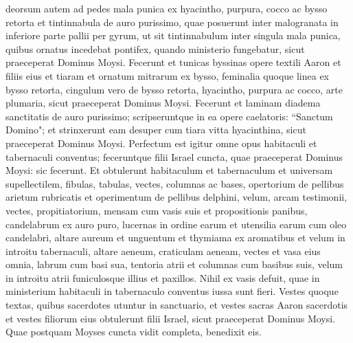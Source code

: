 \begin{biblechapter}
\verse deorsum autem ad pedes mala punica ex hyacintho, purpura, cocco ac bysso retorta  
\verse et tintinnabula de auro purissimo, quae posuerunt inter malogranata in inferiore parte pallii per gyrum, 
\verse ut sit tintinnabulum inter singula mala punica, quibus ornatus incedebat pontifex, quando ministerio fungebatur, sicut praeceperat Dominus Moysi. 
\verse Fecerunt et tunicas byssinas opere textili Aaron et filiis eius 
\verse et tiaram et ornatum mitrarum ex bysso, feminalia quoque linea ex bysso retorta,  
\verse cingulum vero de bysso retorta, hyacintho, purpura ac cocco, arte plumaria, sicut praeceperat Dominus Moysi. 
\verse Fecerunt et laminam diadema sanctitatis de auro purissimo; scripseruntque in ea opere caelatoris: “Sanctum Domino"; 
\verse et strinxerunt eam desuper cum tiara vitta hyacinthina, sicut praeceperat Dominus Moysi. 
\verse Perfectum est igitur omne opus habitaculi et tabernaculi conventus; feceruntque filii Israel cuncta, quae praeceperat Dominus Moysi: sic fecerunt. 
\verse Et obtulerunt habitaculum et tabernaculum et universam supellectilem, fibulas, tabulas, vectes, columnas ac bases, 
\verse opertorium de pellibus arietum rubricatis et operimentum de pellibus delphini, velum, 
\verse arcam testimonii, vectes, propitiatorium, 
\verse mensam cum vasis suis et propositionis panibus, 
\verse candelabrum ex auro puro, lucernas in ordine earum et utensilia earum cum oleo candelabri, 
\verse altare aureum et unguentum et thymiama ex aromatibus et velum in introitu tabernaculi, 
\verse altare aeneum, craticulam aeneam, vectes et vasa eius omnia, labrum cum basi sua, 
\verse tentoria atrii et columnas cum basibus suis, velum in introitu atrii funiculosque illius et paxillos. Nihil ex vasis defuit, quae in ministerium habitaculi in tabernaculo conventus iussa sunt fieri. 
\verse Vestes quoque textas, quibus sacerdotes utuntur in sanctuario, et vestes sacras Aaron sacerdotis et vestes filiorum eius 
\verse obtulerunt filii Israel, sicut praeceperat Dominus Moysi. 
\verse Quae postquam Moyses cuncta vidit completa, benedixit eis. 
\end{biblechapter}

